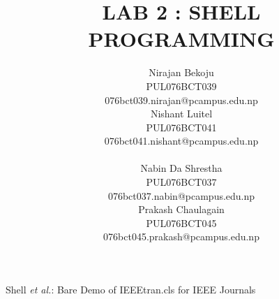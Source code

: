 \documentclass[journal,onecolumn]{IEEEtran}
\begin{document}
\title{LAB 2 : SHELL PROGRAMMING}


\author{
  \begin{multicols}{2}
    \centering
    Nirajan Bekoju\\
    PUL076BCT039\\
    076bct039.nirajan@pcampus.edu.np\\
    \columnbreak
    Nishant Luitel\\
    PUL076BCT041 \\
    076bct041.nishant@pcampus.edu.np \\
  \end{multicols}
  \begin{multicols}{2}
    \centering
    Nabin Da Shrestha\\
    PUL076BCT037 \\
    076bct037.nabin@pcampus.edu.np \\
    \columnbreak
    Prakash Chaulagain \\
    PUL076BCT045 \\
    076bct045.prakash@pcampus.edu.np
  \end{multicols}
}



%
{Shell \MakeLowercase{\textit{et al.}}: Bare Demo of IEEEtran.cls for IEEE Journals}

\maketitle
\end{document}
